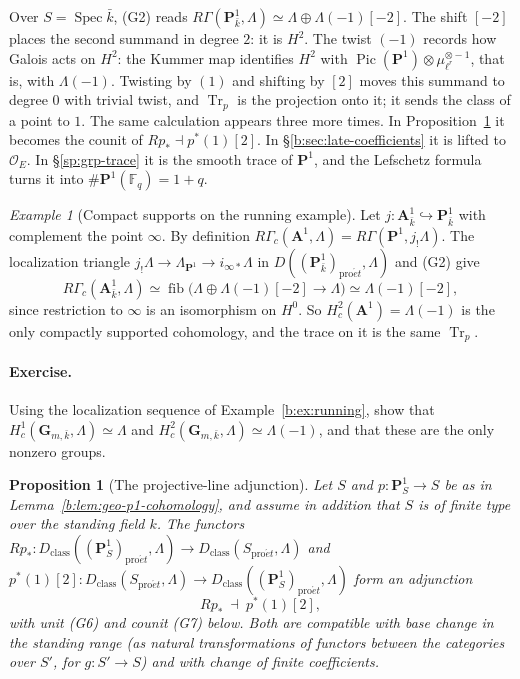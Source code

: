 \documentclass[11pt,a4paper]{article}
\numberwithin{equation}{section}
\newtheorem{proposition}[theorem]{Proposition}
\theoremstyle{definition}
\theoremstyle{remark}
\newcommand{\proet}{\mathrm{pro}\acute{e}t}
\newcommand{\fib}{\operatorname{fib}}
\newtheorem{example}[theorem]{Example}
\begin{document}
Over \(S=\operatorname{Spec}\bar k\), (G2) reads
\(R\Gamma(\mathbf P^1_{\bar k},\Lambda)\simeq\Lambda\oplus\Lambda(-1)[-2]\).
The shift \([-2]\) places the second summand in degree \(2\): it is
\(H^2\). The twist \((-1)\) records how Galois acts on \(H^2\): the
Kummer map identifies \(H^2\) with
\(\operatorname{Pic}(\mathbf P^1)\otimes\mu_{\ell^r}^{\otimes-1}\), that is, with
\(\Lambda(-1)\). Twisting by \((1)\) and shifting
by \([2]\) moves this summand to degree \(0\) with trivial twist, and
\(\operatorname{Tr}_p\) is the projection onto it; it sends the class
of a point to \(1\). The same calculation appears three more times. In
Proposition~\ref{b:prop:geo-p1-adjunction} it becomes the counit of
\(Rp_*\dashv p^*(1)[2]\). In \S\ref{b:sec:late-coefficients} it is
lifted to \(\mathcal O_E\). In \S\ref{sp:grp-trace} it is the smooth
trace of \(\mathbf P^1\), and the Lefschetz formula turns it into
\(\#\mathbf P^1(\mathbb F_q)=1+q\).

\begin{example}[Compact supports on the running example]
Let \(j:\mathbf A^1_{\bar k}\hookrightarrow\mathbf P^1_{\bar k}\) with
complement the point \(\infty\). By definition
\(R\Gamma_c(\mathbf A^1,\Lambda)=R\Gamma(\mathbf P^1,j_!\Lambda)\). The
localization triangle
\(j_!\Lambda\to\Lambda_{\mathbf P^1}\to i_{\infty*}\Lambda\) in
\(D((\mathbf P^1_{\bar k})_{\proet},\Lambda)\) and (G2)
give
\[
 R\Gamma_c(\mathbf A^1_{\bar k},\Lambda)
 \simeq\fib\bigl(\Lambda\oplus\Lambda(-1)[-2]\to\Lambda\bigr)
 \simeq\Lambda(-1)[-2],
\]
since restriction to \(\infty\) is an isomorphism on \(H^0\). So
\(H^2_c(\mathbf A^1)=\Lambda(-1)\) is the only compactly supported
cohomology, and the trace on it is the same \(\operatorname{Tr}_p\).
\end{example}

\paragraph*{Exercise.} Using the localization sequence of
Example~\ref{b:ex:running}, show that
\(H^1_c(\mathbf G_{m,\bar k},\Lambda)\simeq\Lambda\) and
\(H^2_c(\mathbf G_{m,\bar k},\Lambda)\simeq\Lambda(-1)\), and that these
are the only nonzero groups.

\begin{proposition}[The projective-line adjunction]
\label{b:prop:geo-p1-adjunction}
Let \(S\) and \(p:\mathbf P^1_S\to S\) be as in
Lemma~\ref{b:lem:geo-p1-cohomology}, and assume in addition that $S$ is
of finite type over the standing field $k$. The functors
\(Rp_*\colon D_{\mathrm{class}}((\mathbf P^1_S)_{\proet},\Lambda)\to
D_{\mathrm{class}}(S_{\proet},\Lambda)\) and
\(p^*(1)[2]\colon D_{\mathrm{class}}(S_{\proet},\Lambda)\to
D_{\mathrm{class}}((\mathbf P^1_S)_{\proet},\Lambda)\) form
an adjunction
\[
 Rp_* \ \dashv\ p^*(1)[2],
                                                               \tag{G4}
\]
with unit (G6) and counit (G7) below. Both are compatible with
base change in the standing range (as natural transformations of
functors between the categories over \(S'\), for \(g:S'\to S\)) and
with change of finite coefficients.
\end{proposition}
\end{document}
